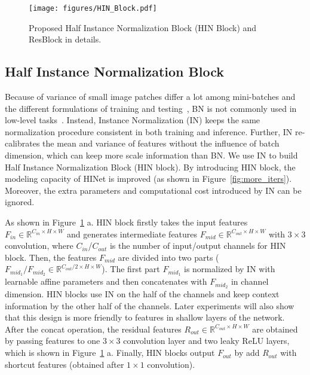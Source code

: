 \documentclass[final]{cvpr}
\begin{document}
\begin{figure}
    \centering
    \texttt{[image: figures/HIN\_Block.pdf]}
    \vspace{-0.1cm}
    \caption{Proposed Half Instance Normalization Block (HIN Block) and ResBlock in details.}
    \label{fig:HIN_block}
    \vspace{-0.3cm}
\end{figure}

\subsection{Half Instance Normalization Block}
\label{HIN Block}
Because of variance of small image patches differ a lot among mini-batches and the different formulations of training and testing~\cite{yu2018wide}, BN\cite{ioffe2015batch} is not commonly used in low-level tasks~\cite{ledig2017photo,lim2017enhanced}. Instead, Instance Normalization (IN) keeps the same normalization procedure consistent in both training and inference. Further, IN re-calibrates the mean and variance of features without the influence of batch dimension, which can keep more scale information than BN. We use IN to build Half Instance Normalization Block (HIN block). By introducing HIN block, the modeling capacity of HINet is improved (as shown in Figure~\ref{fig:more_iters}). Moreover, the extra parameters and computational cost introduced by IN can be ignored.

As shown in Figure~\ref{fig:HIN_block} a. HIN block firstly takes the input features $F_{in} \in \mathbb{R}^{C_{in} \times H \times W}$ and generates intermediate features $F_{mid} \in \mathbb{R}^{C_{out} \times H \times W}$ with $3 \times 3$ convolution, where $C_{in}$/$C_{out}$ is the number of input/output channels for HIN block. Then, the features $F_{mid}$ are divided into two parts ($F_{mid_1}/F_{mid_2} \in \mathbb{R}^{C_{out}/2 \times H \times W}$). The first part $F_{mid_1}$ is normalized by IN with learnable affine parameters and then concatenates with $F_{mid_2}$ in channel dimension. HIN blocks use IN on the half of the channels and keep context information by the other half of the channels. Later experiments will also show that this design is more friendly to features in shallow layers of the network. After the concat operation, the residual features $R_{out} \in \mathbb{R}^{C_{out} \times H \times W}$ are obtained by passing features to one $3 \times 3$ convolution layer and two leaky ReLU layers, which is shown in Figure~\ref{fig:HIN_block} a. Finally, HIN blocks output $F_{out}$ by add $R_{out}$ with shortcut features (obtained after $1 \times 1$ convolution).
\end{document}

